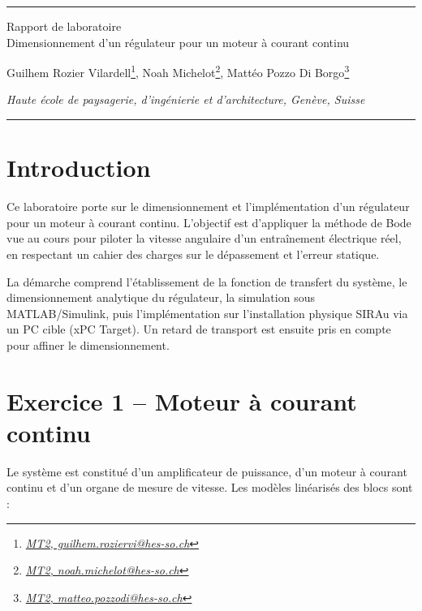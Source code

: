 \documentclass[a4paper,5pt]{article}
\begin{document}
\begin{center}
\rule{\linewidth}{0.4pt}
{\large
Rapport de laboratoire\\
\vspace{2mm}
Dimensionnement d'un régulateur pour un moteur à courant continu
}

\vspace{8mm}

Guilhem Rozier Vilardell\footnote{\textit{\href{mailto:guilhem.roziervi@hes-so.ch}{MT2, guilhem.roziervi@hes-so.ch}}},
Noah Michelot\footnote{\textit{\href{mailto:noah.michelot@hes-so.ch}{MT2, noah.michelot@hes-so.ch}}},
Mattéo Pozzo Di Borgo\footnote{\textit{\href{mailto:matteo.pozzodi@hes-so.ch}{MT2, matteo.pozzodi@hes-so.ch}}}

\vspace{3mm}

\footnotesize{
\textit{Haute école de paysagerie, d'ingénierie et d'architecture, Genève, Suisse}
}
\rule{\linewidth}{0.4pt}
\vspace{9mm}

\end{center}

\setlength{\parskip}{10pt}


\section{Introduction}

Ce laboratoire porte sur le dimensionnement et l'implémentation d'un régulateur
pour un moteur à courant continu. L'objectif est d'appliquer la méthode de Bode
vue au cours pour piloter la vitesse angulaire d'un entraînement électrique réel,
en respectant un cahier des charges sur le dépassement et l'erreur statique.

La démarche comprend l'établissement de la fonction de transfert du système,
le dimensionnement analytique du régulateur, la simulation sous MATLAB/Simulink,
puis l'implémentation sur l'installation physique SIRAu via un PC cible (xPC Target).
Un retard de transport est ensuite pris en compte pour affiner le dimensionnement.

\section{Exercice 1 -- Moteur à courant continu}

Le système est constitué d'un amplificateur de puissance, d'un moteur à courant
continu et d'un organe de mesure de vitesse. Les modèles linéarisés des blocs
sont :
\end{document}
